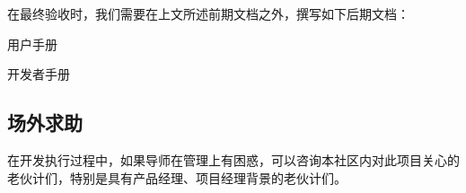 在最终验收时，我们需要在上文所述前期文档之外，撰写如下后期文档：

\begin{compactitem}
	\item 用户手册
	\item 开发者手册
\end{compactitem}

\subsection{场外求助}

在开发执行过程中，如果导师在管理上有困惑，可以咨询本社区内对此项目关心的老伙计们，特别是具有产品经理、项目经理背景的老伙计们。

















